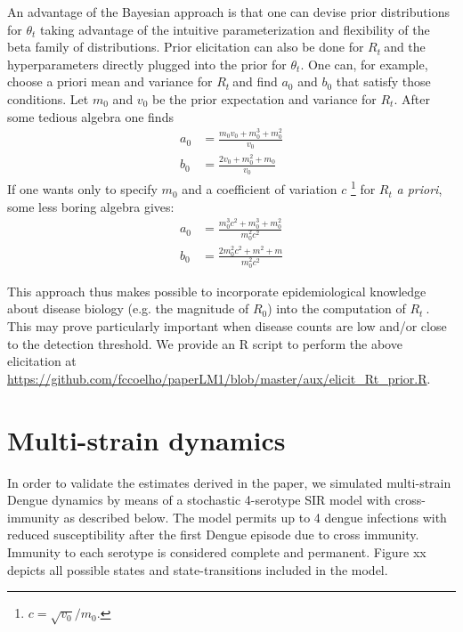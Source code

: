 \documentclass[12pt]{article}
\def \rr {$R_{t}\ $}
\begin{document}
An advantage of the Bayesian approach is that one can devise prior 
distributions for $\theta_t$ taking advantage of the intuitive parameterization 
and flexibility of the beta family of distributions.
Prior elicitation can also be done for \rr and the hyperparameters directly 
plugged into the prior for $\theta_t$. 
One can, for example, choose a priori mean and variance for \rr and find $a_0$ 
and $b_0$ that satisfy those conditions.
Let $m_0$ and $v_0$ be the prior expectation and variance for $R_t$. 
After some tedious algebra one finds
\begin{align}
\label{seq:elicitation}
a_0 &= \frac{m_0v_0 + m_0^3 + m_0^2}{v_0} \\
b_0 &= \frac{2v_0 + m_0^2 + m_0}{v_0}
\end{align}
If one wants only to specify $m_0$ and a coefficient of variation $c$ 
\footnote{$c = \sqrt{v_0}/ m_0$.} for $R_t$ \textit{a priori}, some less boring 
algebra gives:
\begin{align}
\label{seq:elicitationcv}
a_0 &= \frac{m_0^3c^2 + m_0^3 + m_0^2}{m_0^2c^2} \\
b_0 &= \frac{2m_0^2c^2 + m^2 + m}{m_0^2c^2}
\end{align}

This approach thus makes possible to incorporate epidemiological knowledge 
about disease biology (e.g. the magnitude of $R_0$) into the computation of \rr.
This may prove particularly important when disease counts are low and/or close 
to the detection threshold.
We provide an R script to perform the above elicitation at 
\url{https://github.com/fccoelho/paperLM1/blob/master/aux/elicit_Rt_prior.R}.
\newpage
\section*{Multi-strain dynamics}

In order to validate the estimates derived in the paper, we simulated 
multi-strain Dengue dynamics by means of a stochastic 4-serotype SIR model with 
cross-immunity as described below. 
The model permits up to 4 dengue infections 
with reduced susceptibility after the first Dengue episode due to cross 
immunity. 
Immunity to each serotype is considered complete and permanent. 
Figure xx depicts all possible states and state-transitions included in the 
model.
\end{document}

